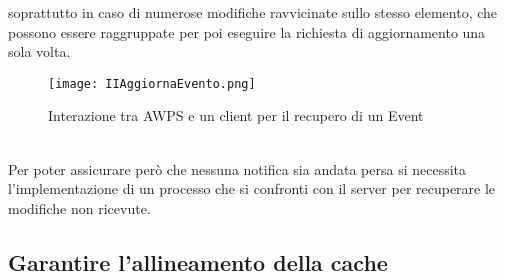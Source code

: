 soprattutto in caso di 
numerose modifiche ravvicinate sullo stesso elemento, 
che possono essere raggruppate per poi eseguire la richiesta di aggiornamento una sola volta.\\
\begin{figure}[htpb]
    \centering
    \texttt{[image: IIAggiornaEvento.png]}
    \caption{Interazione tra AWPS e un client per il recupero di un Event}
\end{figure}	
\\
Per poter assicurare però che nessuna notifica sia andata persa
si necessita l'implementazione di un processo che
si confronti con il server per recuperare le modifiche non ricevute.\\
\clearpage
\subsection{Garantire l'allineamento della cache}

